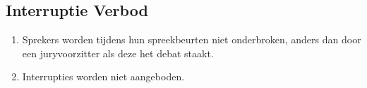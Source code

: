 \subsection{Interruptie Verbod}

\begin{enumerate}
\item Sprekers worden tijdens hun spreekbeurten niet onderbroken, anders dan door een juryvoorzitter als deze het debat staakt.
\item Interrupties worden niet aangeboden.
\end{enumerate}
